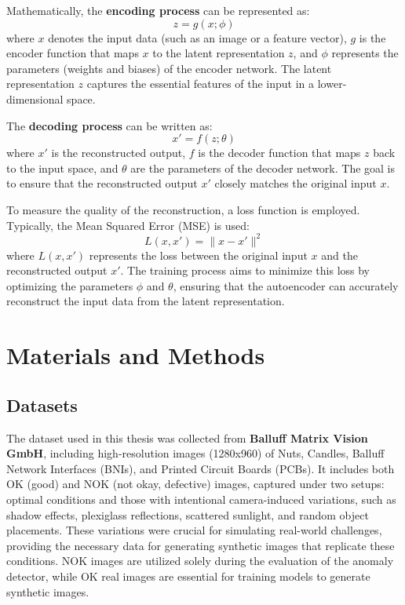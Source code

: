 \documentclass[12pt,DIV14,BCOR12mm,a4paper,footinclude=false,headinclude,parskip=half-,twoside,openright,cleardoublepage=empty,toc=index,bibliography=totoc,listof=totoc]{scrreprt}
\numberwithin{equation}{chapter}
\begin{document}
Mathematically, the \textbf{encoding process} can be represented as:
\begin{equation}
z = g(x; \phi)
\end{equation}
where \( x \) denotes the input data (such as an image or a feature vector), \( g \) is the encoder function that maps \( x \) to the latent representation \( z \), and \( \phi \) represents the parameters (weights and biases) of the encoder network. The latent representation \( z \) captures the essential features of the input in a lower-dimensional space.

The \textbf{decoding process} can be written as:
\begin{equation}
x' = f(z; \theta)
\end{equation}
where \( x' \) is the reconstructed output, \( f \) is the decoder function that maps \( z \) back to the input space, and \( \theta \) are the parameters of the decoder network. The goal is to ensure that the reconstructed output \( x' \) closely matches the original input \( x \).

To measure the quality of the reconstruction, a loss function is employed. Typically, the Mean Squared Error (MSE) is used:
\begin{equation}
L(x, x') = \|x - x'\|^2
\end{equation}
where \( L(x, x') \) represents the loss between the original input \( x \) and the reconstructed output \( x' \). The training process aims to minimize this loss by optimizing the parameters \( \phi \) and \( \theta \), ensuring that the autoencoder can accurately reconstruct the input data from the latent representation.

\chapter{Materials and Methods}
\label{chapter3}
\section{Datasets}
The dataset used in this thesis was collected from \textbf{Balluff Matrix Vision GmbH}, including high-resolution images (1280x960) of Nuts, Candles, Balluff Network Interfaces (BNIs), and Printed Circuit Boards (PCBs). It includes both OK (good) and NOK (not okay, defective) images, captured under two setups: optimal conditions and those with intentional camera-induced variations, such as shadow effects, plexiglass reflections, scattered sunlight, and random object placements. These variations were crucial for simulating real-world challenges, providing the necessary data for generating synthetic images that replicate these conditions. NOK images are utilized solely during the evaluation of the anomaly detector, while OK real images are essential for training models to generate synthetic images.
\end{document}
